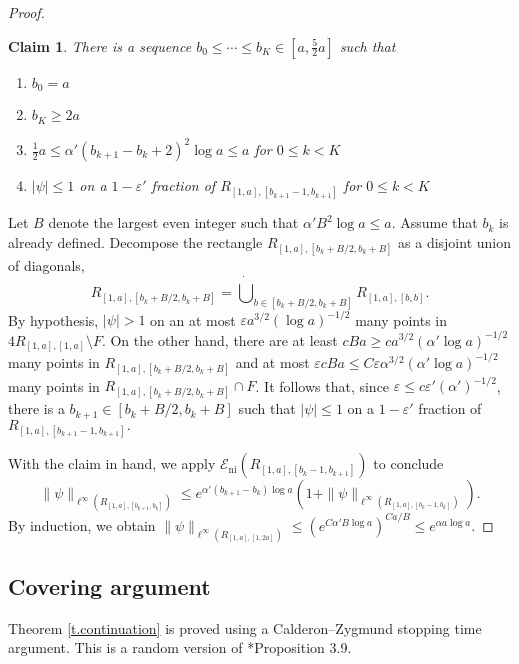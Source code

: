\documentclass{amsart}
\newtheorem{claim}[equation]{Claim}
\newcommand{\tref}[1]{Theorem \ref{t.#1}}
\numberwithin{equation}{section}
\numberwithin{figure}{section}
\newcommand{\ep}{\varepsilon}
\begin{document}
\begin{proof}
\begin{claim}
There is a sequence $b_0 \leq \cdots \leq b_K \in [a,\tfrac52 a]$ such that
\begin{enumerate}
\item $b_0 = a$
\item $b_K \geq 2 a$
\item $\tfrac12 a \leq \alpha' (b_{k+1} - b_k + 2)^2 \log a \leq a$ for $0 \leq k < K$
\item $|\psi| \leq 1$ on a $1- \ep'$ fraction of $R_{[1,a],[b_{k+1}-1,b_{k+1}]}$ for $0 \leq k < K$
\end{enumerate}
\end{claim}

Let $B$ denote the largest even integer such that $\alpha' B^2 \log a \leq a$. Assume that $b_k$ is already defined.  Decompose the rectangle $R_{[1,a],[b_k+B/2,b_k+B]}$ as a disjoint union of diagonals,
\begin{equation*}
R_{[1,a],[b_k+B/2,b_k+B]} = \dot\bigcup_{b \in [b_k+B/2,b_k+B]} R_{[1,a],[b,b]}.
\end{equation*}
By hypothesis, $|\psi| > 1$ on an at most $\ep a^{3/2} (\log a)^{-1/2}$ many points in $4 R_{[1,a],[1,a]} \setminus F$. On the other hand, there are at least $c B a \geq c a^{3/2} (\alpha' \log a)^{-1/2}$ many points in $R_{[1,a],[b_k+B/2,b_k+B]}$ and at most $\ep c B a \leq C \ep \alpha^{3/2} (\alpha' \log a)^{-1/2}$ many points in $R_{[1,a],[b_k+B/2,b_k+B]} \cap F$.  It follows that, since $\ep \leq c \ep' (\alpha')^{-1/2}$, there is a $b_{k+1} \in [b_k+B/2,b_k+B]$ such that $|\psi| \leq 1$ on a $1 - \ep'$ fraction of $R_{[1,a],[b_{k+1}-1,b_{k+1}]}.$

With the claim in hand, we apply $\mathcal E_{\mathrm{ni}}(R_{[1,a],[b_k-1,b_{k+1}]})$ to conclude
\begin{equation*}
\| \psi \|_{\ell^\infty(R_{[1,a],[b_{k+1},b_k]})} \leq e^{\alpha' (b_{k+1} - b_k) \log a} (1 + \| \psi \|_{\ell^\infty(R_{[1,a],[b_k-1,b_k]})}).
\end{equation*}
By induction, we obtain $\|\psi\|_{\ell^\infty(R_{[1,a],[1,2a]})} \leq (e^{C \alpha' B \log a})^{C a / B} \leq e^{\alpha a \log a}$.
\end{proof}

\subsection{Covering argument}

\tref{continuation} is proved using a Calderon--Zygmund stopping time argument.  This is a random version of \cite{Buhovsky-Logunov-Malinnikova-Sodin}*{Proposition 3.9}.
\end{document}
